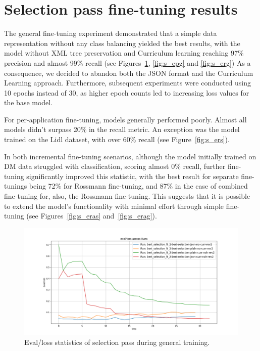 \documentclass[licencjacka,en]{pracamgr}
\begin{document}
\section{Selection pass fine-tuning results}
The general fine-tuning experiment demonstrated that a simple data representation without any class balancing yielded the best results, with the model without XML tree preservation and Curriculum learning reaching 97\% precision and almost 99\% recall (see Figures~\ref{fig:s_elg}, \ref{fig:s_epg} and \ref{fig:s_erg}) As a consequence, we decided to abandon both the JSON format and the Curriculum Learning approach. Furthermore, subsequent experiments were conducted using 10 epochs instead of 30, as higher epoch counts led to increasing loss values for the base model.

For per-application fine-tuning, models generally performed poorly. Almost all models didn't surpass 20\% in the recall metric. An exception was the model trained on the Lidl dataset, with over 60\% recall (see Figure~\ref{fig:s_ers}).

In both incremental fine-tuning scenarios, although the model initially trained on DM data struggled with classification, scoring almost 0\% recall, further fine-tuning significantly improved this statistic, with the best result for separate fine-tunings being 72\%  for Rossmann fine-tuning, and 87\% in the case of combined fine-tuning for, also, the Rossmann fine-tuning. This suggests that it is possible to extend the model's functionality with minimal effort through simple fine-tuning (see Figures~\ref{fig:s_eras} and~\ref{fig:s_erag}).

\begin{figure}[htbp]
    \centering
    \includegraphics[width=0.8\linewidth]{bachelor_images/bert_ft/s_elg.png}
    \caption{Eval/loss statistics of selection pass during general training.}
    \label{fig:s_elg}
\end{figure}
\end{document}
